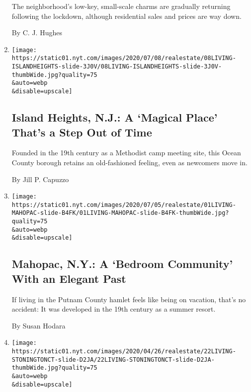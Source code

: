 \begin{enumerate}
  The neighborhood's low-key, small-scale charms are gradually returning
  following the lockdown, although residential sales and prices are way
  down.

  By C. J. Hughes
\item
  \href{/2020/07/08/realestate/island-heights-nj-a-magical-place-thats-a-step-out-of-time.html}{}

  \texttt{[image: https://static01.nyt.com/images/2020/07/08/realestate/08LIVING-ISLANDHEIGHTS-slide-3J0V/08LIVING-ISLANDHEIGHTS-slide-3J0V-thumbWide.jpg?quality=75\\\&auto=webp\\\&disable=upscale]}

  \hypertarget{island-heights-nj-a-magical-place-thats-a-step-out-of-time}{%
  \subsection{Island Heights, N.J.: A `Magical Place' That's a Step Out
  of
  Time}\label{island-heights-nj-a-magical-place-thats-a-step-out-of-time}}

  Founded in the 19th century as a Methodist camp meeting site, this
  Ocean County borough retains an old-fashioned feeling, even as
  newcomers move in.

  By Jill P. Capuzzo
\item
  \href{/2020/07/01/realestate/mahopac-ny-a-bedroom-community-with-an-elegant-past.html}{}

  \texttt{[image: https://static01.nyt.com/images/2020/07/05/realestate/01LIVING-MAHOPAC-slide-B4FK/01LIVING-MAHOPAC-slide-B4FK-thumbWide.jpg?quality=75\\\&auto=webp\\\&disable=upscale]}

  \hypertarget{mahopac-ny-a-bedroom-community-with-an-elegant-past}{%
  \subsection{Mahopac, N.Y.: A `Bedroom Community' With an Elegant
  Past}\label{mahopac-ny-a-bedroom-community-with-an-elegant-past}}

  If living in the Putnam County hamlet feels like being on vacation,
  that's no accident: It was developed in the 19th century as a summer
  resort.

  By Susan Hodara
\item
  \href{/2020/04/22/realestate/stonington-conn-a-waterfront-community-with-a-colonial-vibe.html}{}

  \texttt{[image: https://static01.nyt.com/images/2020/04/26/realestate/22LIVING-STONINGTONCT-slide-D2JA/22LIVING-STONINGTONCT-slide-D2JA-thumbWide.jpg?quality=75\\\&auto=webp\\\&disable=upscale]}


\end{enumerate}
